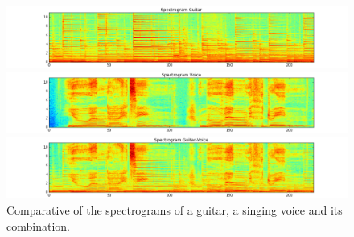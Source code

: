 \begin{figure}[h]
    
    \begin{minipage}{1.0\linewidth}
       \centering
        \centerline{\includegraphics[width=1.25\onecolwid]{figures/guitar}}
    \end{minipage}
    
    \begin{minipage}{1.0\linewidth}
        \centering
        \centerline{\includegraphics[width=1.25\onecolwid]{figures/singVoice}}
    \end{minipage}
    \begin{minipage}{1.0\linewidth}
        \centering
        \centerline{\includegraphics[width=1.25\onecolwid]{figures/gitarVoice}}
    \end{minipage}
    
   
     
    \caption[Spectrograms of guitar and singing voice]{Comparative of the spectrograms of a guitar, a singing voice and its combination. \cite{DS:Weembly}}
    \label{fig:guitarVoice}
\end{figure}

